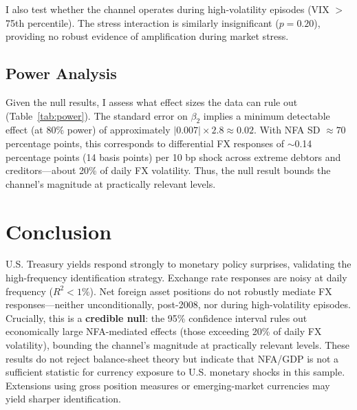 \documentclass[12pt]{article}
\begin{document}
I also test whether the channel operates during high-volatility episodes (VIX $>$ 75th percentile). The stress interaction is similarly insignificant ($p = 0.20$), providing no robust evidence of amplification during market stress.

\subsection*{Power Analysis}

Given the null results, I assess what effect sizes the data can rule out (Table~\ref{tab:power}). The standard error on $\beta_2$ implies a minimum detectable effect (at 80\% power) of approximately $|0.007| \times 2.8 \approx 0.02$. With NFA SD $\approx 70$ percentage points, this corresponds to differential FX responses of $\sim$0.14 percentage points (14 basis points) per 10 bp shock across extreme debtors and creditors---about 20\% of daily FX volatility. Thus, the null result bounds the channel's magnitude at practically relevant levels.

\section*{Conclusion}

U.S. Treasury yields respond strongly to monetary policy surprises, validating the high-frequency identification strategy. Exchange rate responses are noisy at daily frequency ($R^2 < 1\%$). Net foreign asset positions do not robustly mediate FX responses---neither unconditionally, post-2008, nor during high-volatility episodes. Crucially, this is a \textbf{credible null}: the 95\% confidence interval rules out economically large NFA-mediated effects (those exceeding 20\% of daily FX volatility), bounding the channel's magnitude at practically relevant levels. These results do not reject balance-sheet theory but indicate that NFA/GDP is not a sufficient statistic for currency exposure to U.S. monetary shocks in this sample. Extensions using gross position measures or emerging-market currencies may yield sharper identification.
\end{document}
